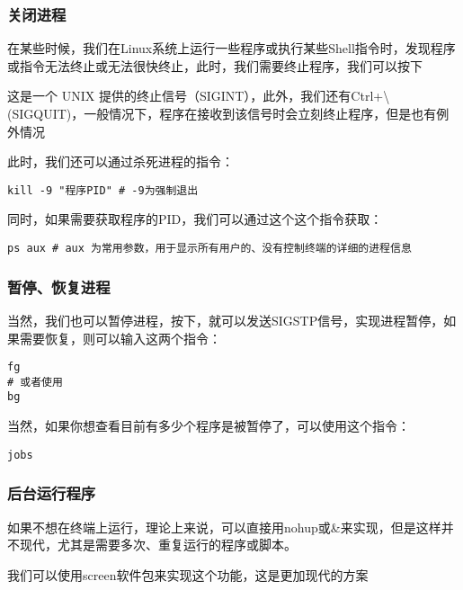 \documentclass[UTF8]{gyh}
\begin{document}
\subsubsection{关闭进程}

在某些时候，我们在Linux系统上运行一些程序或执行某些Shell指令时，发现程序或指令无法终止或无法很快终止，此时，我们需要终止程序，我们可以按下

这是一个 UNIX 提供的终止信号（SIGINT），此外，我们还有Ctrl+\textbackslash (SIGQUIT)，一般情况下，程序在接收到该信号时会立刻终止程序，但是也有例外情况

此时，我们还可以通过杀死进程的指令：

\begin{lstlisting}
kill -9 "程序PID" # -9为强制退出
\end{lstlisting}

同时，如果需要获取程序的PID，我们可以通过这个这个指令获取：

\begin{lstlisting}
ps aux # aux 为常用参数，用于显示所有用户的、没有控制终端的详细的进程信息
\end{lstlisting}


\subsubsection{暂停、恢复进程}

当然，我们也可以暂停进程，按下，就可以发送SIGSTP信号，实现进程暂停，如果需要恢复，则可以输入这两个指令：

\begin{lstlisting}
fg
# 或者使用
bg
\end{lstlisting}

当然，如果你想查看目前有多少个程序是被暂停了，可以使用这个指令：

\begin{lstlisting}
jobs
\end{lstlisting}

\subsubsection{后台运行程序}

如果不想在终端上运行，理论上来说，可以直接用nohup或\&来实现，但是这样并不现代，尤其是需要多次、重复运行的程序或脚本。

我们可以使用screen软件包来实现这个功能，这是更加现代的方案
\end{document}

